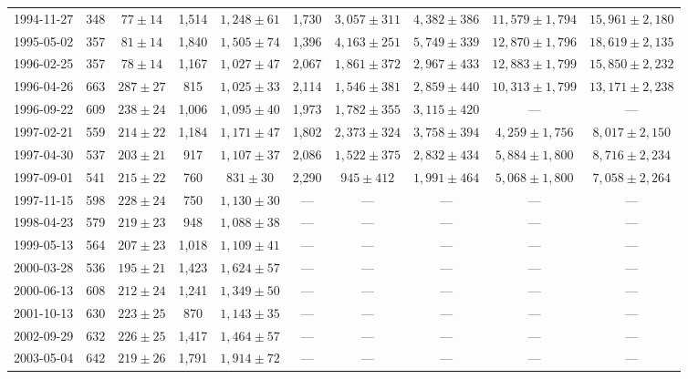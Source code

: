\begin{landscape}
\begin{longtable}{cccccccccc}
{1994-11-27} & 348 & {$77  \pm  14$} & 1,514 & {$1,248 \pm 61$} & 1,730 & {$3,057 \pm 311$} & {$4,382 \pm 386$} & {$11,579 \pm 1,794$} & {$15,961 \pm 2,180$} \\
{1995-05-02} & 357 & {$81  \pm  14$} & 1,840 & {$1,505 \pm 74$} & 1,396 & {$4,163 \pm 251$} & {$5,749 \pm 339$} & {$12,870 \pm 1,796$} & {$18,619 \pm 2,135$} \\
{1996-02-25} & 357 & {$78  \pm  14$} & 1,167 & {$1,027 \pm 47$} & 2,067 & {$1,861 \pm 372$} & {$2,967 \pm 433$} & {$12,883 \pm 1,799$} & {$15,850 \pm 2,232$} \\
{1996-04-26} & 663 & {$287  \pm  27$} & 815 & {$1,025 \pm 33$} & 2,114 & {$1,546 \pm 381$} & {$2,859 \pm 440$} & {$10,313 \pm 1,799$} & {$13,171 \pm 2,238$} \\
{1996-09-22} & 609 & {$238  \pm  24$} & 1,006 & {$1,095 \pm 40$} & 1,973 & {$1,782 \pm 355$} & {$3,115 \pm 420$} & --- & --- \\
{1997-02-21} & 559 & {$214  \pm  22$} & 1,184 & {$1,171 \pm 47$} & 1,802 & {$2,373 \pm 324$} & {$3,758 \pm 394$} & {$4,259 \pm 1,756$} & {$8,017 \pm 2,150$} \\
{1997-04-30} & 537 & {$203  \pm  21$} & 917 & {$1,107 \pm 37$} & 2,086 & {$1,522 \pm 375$} & {$2,832 \pm 434$} & {$5,884 \pm 1,800$} & {$8,716 \pm 2,234$} \\
{1997-09-01} & 541 & {$215  \pm  22$} & 760 & {$831 \pm 30$} & 2,290 & {$945 \pm 412$} & {$1,991 \pm 464$} & {$5,068 \pm 1,800$} & {$7,058 \pm 2,264$} \\
{1997-11-15} & 598 & {$228  \pm  24$} & 750 & {$1,130 \pm 30$} & --- & --- & --- & --- & --- \\
{1998-04-23} & 579 & {$219  \pm  23$} & 948 & {$1,088 \pm 38$} & --- & --- & --- & --- & --- \\
{1999-05-13} & 564 & {$207  \pm  23$} & 1,018 & {$1,109 \pm 41$} & --- & --- & --- & --- & --- \\
{2000-03-28} & 536 & {$195  \pm  21$} & 1,423 & {$1,624 \pm 57$} & --- & --- & --- & --- & --- \\
{2000-06-13} & 608 & {$212  \pm  24$} & 1,241 & {$1,349 \pm 50$} & --- & --- & --- & --- & --- \\
{2001-10-13} & 630 & {$223  \pm  25$} & 870 & {$1,143 \pm 35$} & --- & --- & --- & --- & --- \\
{2002-09-29} & 632 & {$226  \pm  25$} & 1,417 & {$1,464 \pm 57$} & --- & --- & --- & --- & --- \\
{2003-05-04} & 642 & {$219  \pm  26$} & 1,791 & {$1,914 \pm 72$} & --- & --- & --- & --- & --- \\

\end{longtable}
\end{landscape}
